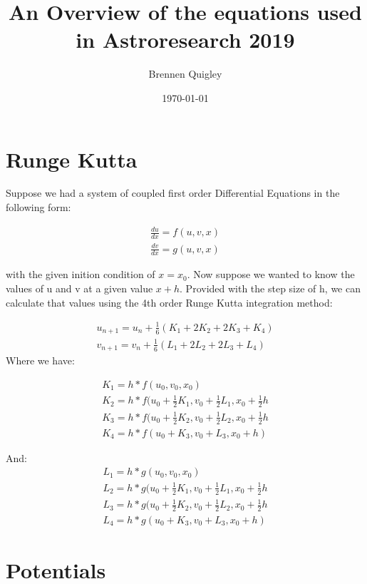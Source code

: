 \documentclass[letterpaper,12pt]{article}
\begin{document}
\title{%
  An Overview of the equations used in Astroresearch 2019 }
\author{Brennen Quigley}
\date{\today}
\maketitle


\section{Runge Kutta}
Suppose we had a system of coupled first order Differential Equations in the following form:

\begin{align*} 
\frac{du}{dx} = f(u,v,x) \\ 
\frac{dv}{dx} = g(u,v,x)
\end{align*}

with the given inition condition of $x = x_{0}$. Now suppose we wanted to know the values of u and v at a given value $x+h$. Provided with the step size of h, we can calculate that values using the 4th order Runge Kutta integration method:

\begin{align*} 
u_{n+1} = u_{n} + \frac{1}{6}(K_{1}+2K_{2}+2K_{3}+K_{4}) \\ 
v_{n+1} = v_{n} + \frac{1}{6}(L_{1}+2L_{2}+2L_{3}+L_{4})
\end{align*}
Where we have:


\begin{align*} 
K_{1} = h*f(u_{0}, v_{0}, x_{0})\\ 
K_{2} = h*f(u_{0}+\frac{1}{2}K_{1}, v_{0} + \frac{1}{2}L_{1}, x_{0} + \frac{1}{2}h\\
K_{3} = h*f(u_{0}+\frac{1}{2}K_{2}, v_{0} + \frac{1}{2}L_{2}, x_{0} + \frac{1}{2}h\\
K_{4} = h*f(u_{0}+K_{3}, v_{0} + L_{3}, x_{0} + h)
\end{align*}

And:
\begin{align*} 
L_{1} = h*g(u_{0}, v_{0}, x_{0})\\ 
L_{2} =h*g(u_{0}+\frac{1}{2}K_{1}, v_{0} + \frac{1}{2}L_{1}, x_{0} + \frac{1}{2}h\\
L_{3} =h*g(u_{0}+\frac{1}{2}K_{2}, v_{0} + \frac{1}{2}L_{2}, x_{0} + \frac{1}{2}h\\
L_{4} =h*g(u_{0}+K_{3}, v_{0} + L_{3}, x_{0} + h)
\end{align*}

\section{Potentials}
\end{document}
